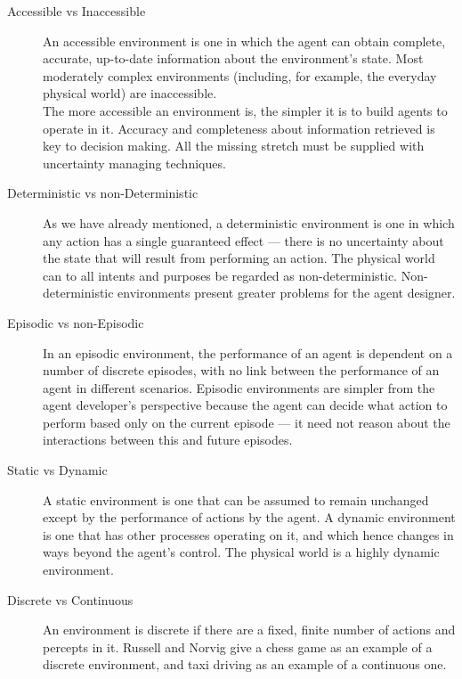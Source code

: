 \documentclass[11pt,oneside,a4paper,openright]{report}
\begin{document}
\begin{description} 
	\item [Accessible vs Inaccessible] An accessible environment is one in which the agent
		can obtain complete, accurate, up-to-date information about the environment’s state.
		Most moderately complex environments (including, for example, the everyday physical 
		world) are inaccessible.\\
		The more accessible an environment is, the simpler it is to build agents to operate in it.
		Accuracy and completeness about information retrieved is key to decision making.
		All the missing stretch must be supplied with uncertainty managing techniques.
	\item [Deterministic vs non-Deterministic] As we have already mentioned, a deterministic
		environment is one in which any action has a single guaranteed effect — there is no 
		uncertainty about the state that will result from performing an action.
		The physical world can to all intents and purposes be regarded as non-deterministic.
		Non-deterministic environments present greater problems for the agent designer.
	\item [Episodic vs non-Episodic] In an episodic environment, the performance of an
		agent is dependent on a number of discrete episodes, with no link between the performance
		of an agent in different scenarios. Episodic environments are simpler from the agent
		developer’s perspective because the agent can decide what action to perform based only 
		on the current episode — it need not reason about the interactions between this and future 
		episodes.
	\item [Static vs Dynamic] A static environment is one that can be assumed to remain unchanged 
		except by the performance of actions by the agent. A dynamic environment is one that has 
		other processes operating on it, and which hence changes in ways beyond the agent’s control.
		The physical world is a highly dynamic environment.
	\item [Discrete vs Continuous] An environment is discrete if there are a fixed, finite
		number of actions and percepts in it. Russell and Norvig give a chess game as 
		an example of a discrete environment, and taxi driving as an example of a continuous one.
\end{description}
\end{document}
